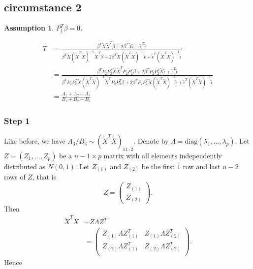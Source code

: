 \documentclass[review]{elsarticle}
\theoremstyle{plain}
\newtheorem{assumption}{\quad\quad Assumption}
\theoremstyle{definition}
\theoremstyle{remark}
\begin{document}
\subsection{circumstance 2}
\begin{assumption}
$P_1^T \beta=0$.
\end{assumption}


\begin{equation}
    \begin{aligned}
        T&=\frac{\beta^T \tilde{X}\tilde{X}^T \beta+
        2\beta^T \tilde{X}\tilde{\epsilon}+
        \tilde{\epsilon}^T\tilde{\epsilon}
    }{\beta^T \tilde{X}{(\tilde{X}^T\tilde{X})}^{-1}\tilde{X}^T \beta+
        2\beta^T \tilde{X}{(\tilde{X}^T\tilde{X})}^{-1}\tilde{\epsilon}+
        \tilde{\epsilon}^T{(\tilde{X}^T\tilde{X})}^{-1}\tilde{\epsilon}
    }\\
        &=\frac{\beta^T P_2 P_2^T \tilde{X}\tilde{X}^T P_2 P_2^T\beta+
        2\beta^T P_2 P_2^T \tilde{X}\tilde{\epsilon}+
        \tilde{\epsilon}^T\tilde{\epsilon}
    }{\beta^T P_2 P_2^T\tilde{X}{(\tilde{X}^T\tilde{X})}^{-1}\tilde{X}^T P_2 P_2^T\beta+
        2\beta^T P_2 P_2^T\tilde{X}{(\tilde{X}^T\tilde{X})}^{-1}\tilde{\epsilon}+
        \tilde{\epsilon}^T{(\tilde{X}^T\tilde{X})}^{-1}\tilde{\epsilon}
    }\\
        &=\frac{A_1+A_2+A_3}{B_1+B_2+B_3}
    \end{aligned}
\end{equation}
\subsubsection{Step 1}
 Like before, we have $A_3/B_3\sim {(\tilde{X}^T\tilde{X})}_{11\cdot 2}$. Denote by $\Lambda=\textrm{diag} (\lambda_1,\ldots,\lambda_p)$. Let $Z=(Z_1,\ldots,Z_p)$ be a $n-1\times p$ matrix with all elements independently distributed as $N(0,1)$. Let $Z_{(1)}$ and $Z_{(2)}$ be the first $1$ row and last $n-2$ rows of $Z$, that is
\[
    Z=\begin{pmatrix} 
        Z_{(1)}\\
        Z_{(2)}
    \end{pmatrix}.
    \]
Then
\begin{equation}
    \begin{aligned}
        \tilde{X}^T\tilde{X}&\sim Z\Lambda Z^T\\
        &=\begin{pmatrix}
            Z_{(1)}\Lambda Z_{(1)}^T & Z_{(1)}\Lambda Z_{(2)}^T\\
            Z_{(2)}\Lambda Z_{(1)}^T & Z_{(2)}\Lambda Z_{(2)}^T\\
        \end{pmatrix}.
    \end{aligned}
\end{equation}
Hence
\end{document}
